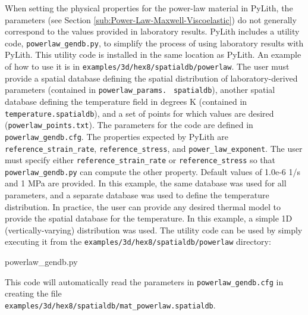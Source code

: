 When setting the physical properties for the power-law material in
PyLith, the parameters (see Section \ref{sub:Power-Law-Maxwell-Viscoelastic})
do not generally correspond to the values provided in laboratory results.
PyLith includes a utility code, \texttt{powerlaw\_gendb.py}, to simplify
the process of using laboratory results with PyLith. This utility
code is installed in the same location as PyLith. An example of how
to use it is in \texttt{examples/3d/hex8/spatialdb/powerlaw}. The
user must provide a spatial database defining the spatial distribution
of laboratory-derived parameters (contained in \texttt{powerlaw\_params.}~\linebreak{}
\texttt{spatialdb}), another spatial database defining the temperature
field in degrees K (contained in \texttt{temperature.spatialdb}),
and a set of points for which values are desired (\texttt{powerlaw\_points.txt}).
The parameters for the code are defined in \texttt{powerlaw\_gendb.cfg}.
The properties expected by PyLith are \texttt{reference\_strain\_rate},
\texttt{reference\_stress}, and \texttt{power\_law\_exponent}. The
user must specify either \texttt{reference\_strain\_rate} or \texttt{reference\_stress}
so that \texttt{powerlaw\_gendb.py} can compute the other property.
Default values of 1.0e-6 1/s and 1 MPa are provided. In this example,
the same database was used for all parameters, and a separate database
was used to define the temperature distribution. In practice, the
user can provide any desired thermal model to provide the spatial
database for the temperature. In this example, a simple 1D (vertically-varying)
distribution was used. The utility code can be used by simply executing
it from the \texttt{examples/3d/hex8/spatialdb/powerlaw} directory:
\begin{lyxcode}
powerlaw\_gendb.py
\end{lyxcode}
This code will automatically read the parameters in \texttt{powerlaw\_gendb.cfg}
in creating the file\\
 \texttt{examples/3d/hex8/spatialdb/mat\_powerlaw.spatialdb}.

